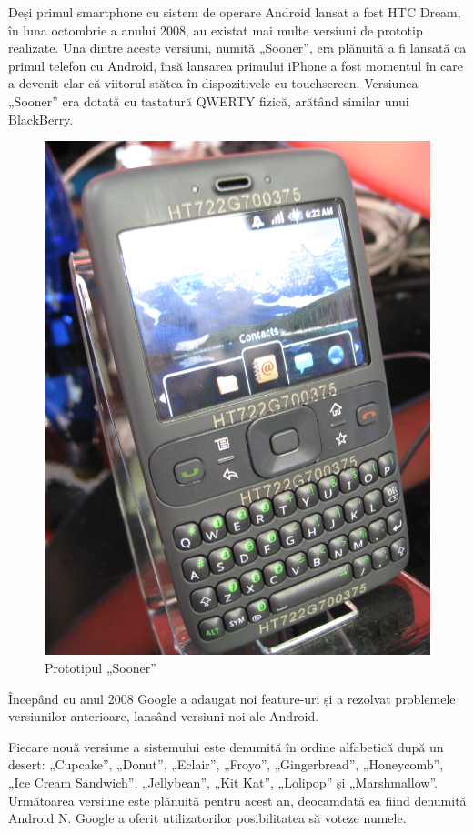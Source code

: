 \documentclass[12pt,a4paper]{article}
\begin{document}
Deși primul smartphone cu sistem de operare Android lansat a fost HTC Dream, în luna octombrie a anului 2008, au existat mai multe versiuni de prototip realizate. Una dintre aceste versiuni, numită „Sooner”, era plănuită a fi lansată ca primul telefon cu Android, însă lansarea primului iPhone a fost momentul în care a devenit clar că viitorul stătea în dispozitivele cu touchscreen. Versiunea „Sooner” era dotată cu tastatură QWERTY fizică, arătând similar unui BlackBerry.

\begin{figure}[hbtp]
\centering
\includegraphics[scale=0.25]{figures/Android_SOONER_mobile_phone_platform_early_device.jpg}
\caption{Prototipul „Sooner”}
\end{figure}

Începând cu anul 2008 Google a adaugat noi feature-uri și a rezolvat problemele versiunilor anterioare, lansând versiuni noi ale Android.

Fiecare nouă versiune a sistemului este denumită în ordine alfabetică după un desert: „Cupcake”, „Donut”, „Eclair”, „Froyo”, „Gingerbread”, „Honeycomb”, „Ice Cream Sandwich”, „Jellybean”, „Kit Kat”, „Lolipop” și „Marshmallow”. Următoarea versiune este plănuită pentru acest an, deocamdată ea fiind denumită Android N. Google a oferit utilizatorilor posibilitatea să voteze numele.
\end{document}
